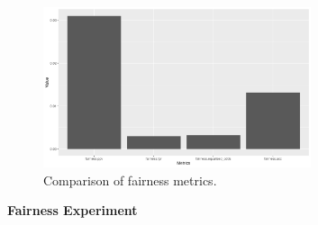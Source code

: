 \begin{figure}
    \centering
    \includegraphics[width=0.7\textwidth]{../figures/sqf_case_study_plot2.png}
    \caption{Comparison of fairness metrics.}
    \label{fig:fairness_metrics_barplot}
\end{figure}

\textbf{Fairness Experiment}


